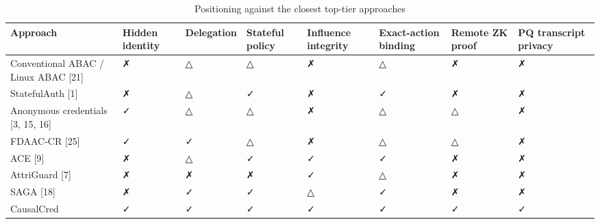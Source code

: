 \begin{table}[t]
\centering
\caption{Positioning against the closest top-tier approaches}
\begin{tabular}{llllllll}
\hline
Approach & Hidden identity & Delegation & Stateful policy & Influence integrity & Exact-action binding & Remote ZK proof & PQ transcript privacy \\
\hline
Conventional ABAC / Linux ABAC [21] & ✗ & △ & △ & ✗ & △ & ✗ & ✗ \\
StatefulAuth [1] & ✗ & △ & ✓ & ✗ & ✓ & ✗ & ✗ \\
Anonymous credentials [3, 15, 16] & ✓ & △ & △ & ✗ & △ & △ & ✗ \\
FDAAC-CR [25] & ✓ & ✓ & △ & ✗ & △ & △ & ✗ \\
ACE [9] & ✗ & △ & ✓ & ✓ & ✓ & ✗ & ✗ \\
AttriGuard [7] & ✗ & ✗ & ✗ & ✓ & △ & ✗ & ✗ \\
SAGA [18] & ✗ & ✓ & ✓ & △ & ✓ & ✗ & ✗ \\
CausalCred & ✓ & ✓ & ✓ & ✓ & ✓ & ✓ & ✓ \\
\hline
\end{tabular}
\end{table}
